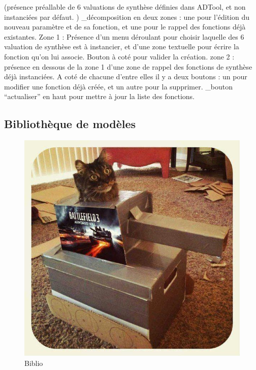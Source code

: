 		(présence préallable de 6 valuations de synthèse définies dans ADTool, et non instanciées par défaut. )
		_décomposition en deux zones : une pour l'édition du nouveau paramètre et de sa fonction, et une pour le rappel des fonctions déjà existantes.
		Zone 1 : Présence d’un menu déroulant pour choisir laquelle des 6 valuation de synthèse est à instancier, et d'une zone textuelle pour écrire la fonction qu'on lui associe. Bouton à coté pour valider la création.
		zone 2 : présence en dessous de la zone 1 d’une zone de rappel des fonctions de synthèse déjà instanciées. A coté de chacune d’entre elles il y a deux boutons : un pour modifier une fonction déjà créée, et un autre pour la supprimer.
		_bouton “actualiser” en haut pour mettre à jour la liste des fonctions.


	\subsection{Bibliothèque de modèles}
		\begin{figure}
			\begin{center}
				\includegraphics[width=1\textwidth]{figure/biblio.jpg}
			\end{center}
			\caption{Biblio}
			\label{fig:biblio}
		\end{figure}

